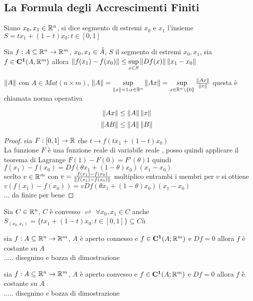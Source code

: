 \subsection{La Formula degli Accrescimenti Finiti}
Siano $x_0,x_1\in \mathbb{R}^n$, si dice segmento di estremi $x_0$ e $x_1$ l'insieme $S={tx_1+(1-t)x_0 : t\in[0,1]}$
\begin{theorem}
	\label{teo:accresc_fin}
	Sia $f:A\subseteq \mathbb{R}^n\rightarrow \mathbb{R}^m$, $x_0,x_1\in\accentset{\circ}{A}$, $S$ il segmento di estremi $x_0,x_1$, sia $f\in \mathbf{C^{1}}(A,\mathbb{R}^m)$ allora $\left\|f(x_1)-f(x_0)\right\|\le \sup\limits_{x\in S}\left\|Df(x)\right\|\left\|x_1-x_0\right\|$
	\begin{observation}
		$\left\|A\right\|$ con $A\in Mat(n\times m)$,  $\left\|A\right\|=\sup\limits_{\left\|x\right\|=1: x\in \mathbb{R}^n}\left\|Ax\right\| = \sup\limits_{x\in \mathbb{R}^n \setminus \{0\}}\frac{\left\|Ax\right\| }{\left\|x\right\| } $ questa è chiamata norma operativa
	\end{observation}
	\begin{note}
		$$\left\|Ax\right\| \le \left\|A\right\| \left\|x\right\|  $$
		$$\left\|AB\right\| \le \left\|A\right\| \left\|B\right\|  $$
	\end{note}
	\begin{proof}
		sia $F:[0,1]\rightarrow \mathbb{R}$ che $t\rightarrow f(tx_1+(1-t)x_0)$\\
		La funzione $F$ è una funzione reale di variabile reale , posso quindi applicare il teorema di Lagrange $F(1)-F(0)=F'(\theta)1$ quindi $f(x_1)-f(x_0) = Df(\theta x_1 + (1-\theta)x_0)(x_1-x_0)$\\
		scelto $v\in \mathbb{R}^m$ con $v = \frac{f(x_1)-f(x_0)}{\left\|f(x_1)-f(x_0)\right\| }$ moltiplico entrambi i membri per $v$ si ottiene $v(f(x_1)-f(x_0)) = vDf(\theta x_1 + (1-\theta)x_0)(x_1-x_0)$\\
		... da finire per bene
	\end{proof}
\end{theorem}
Sia $C\in \mathbb{R}^n$, $C$ è convesso $\rightleftharpoons$ $\forall x_0,x_1\in C$ anche $S_(x_0,x_1) = \{tx_1+(1-t)x_0 : t\in[0,1]\}\subseteq C$ù

\proposition
sia $f:A\subseteq \mathbb{R}^n \rightarrow \mathbb{R}^m$, $A$ è aperto connesso e $f\in \mathbf{C^{1}}(A;\mathbb{R}^m)$ e $Df=0$ allora $f$ è costante su $A$\\
..... disegnino e bozza di dimostrazione

\proposition
sia $f:A\subseteq \mathbb{R}^n \rightarrow \mathbb{R}^m$, $A$ è aperto convesso e $f\in \mathbf{C^{1}}(A;\mathbb{R}^m)$ e $Df=0$ allora $f$ è costante su $A$\\
..... disegnino e bozza di dimostrazione


